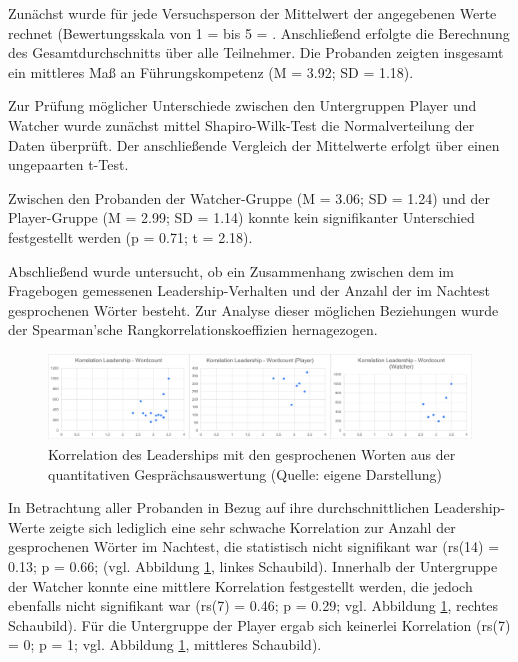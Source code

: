 Zunächst wurde für jede Versuchsperson der Mittelwert der angegebenen Werte rechnet (Bewertungsskala von 1 =  bis 5 = . Anschließend erfolgte die Berechnung des Gesamtdurchschnitts über alle Teilnehmer. Die Probanden zeigten insgesamt ein mittleres Maß an Führungskompetenz (M = 3.92; SD = 1.18). 

Zur Prüfung möglicher Unterschiede zwischen den Untergruppen Player und Watcher wurde zunächst mittel Shapiro-Wilk-Test die Normalverteilung der Daten überprüft. Der anschließende Vergleich der Mittelwerte erfolgt über einen ungepaarten t-Test.

Zwischen den Probanden der Watcher-Gruppe (M = 3.06; SD = 1.24) und der Player-Gruppe (M = 2.99; SD = 1.14) konnte kein signifikanter Unterschied festgestellt werden (p = 0.71; t = 2.18).

Abschließend wurde untersucht, ob ein Zusammenhang zwischen dem im Fragebogen gemessenen Leadership-Verhalten und der Anzahl der im Nachtest gesprochenen Wörter besteht. Zur Analyse dieser möglichen Beziehungen wurde der  Spearman'sche Rangkorrelationskoeffizien hernagezogen.

\begin{figure}[ht]
\centering
\includegraphics[width=1\linewidth]{content/pictures/Korrelation_Leadership_Wordcount_full.png}
\caption{Korrelation des Leaderships mit den gesprochenen Worten aus der quantitativen Gesprächsauswertung (Quelle: eigene Darstellung)}
\label{fig:correlation_leadership_wordcount}
\end{figure}

In Betrachtung aller Probanden in Bezug auf ihre durchschnittlichen Leadership-Werte zeigte sich lediglich eine sehr schwache Korrelation zur Anzahl der gesprochenen Wörter im Nachtest, die statistisch nicht signifikant war (rs(14) = 0.13; p = 0.66; (vgl. Abbildung \ref{fig:correlation_leadership_wordcount}, linkes Schaubild). Innerhalb der Untergruppe der Watcher konnte eine mittlere Korrelation festgestellt werden, die jedoch ebenfalls nicht signifikant war  (rs(7) = 0.46; p = 0.29; vgl. Abbildung \ref{fig:correlation_leadership_wordcount}, rechtes Schaubild). Für die Untergruppe der Player ergab sich keinerlei Korrelation (rs(7) = 0; p = 1; vgl. Abbildung \ref{fig:correlation_leadership_wordcount}, mittleres Schaubild).

